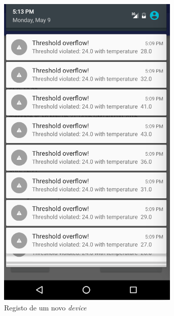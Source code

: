 \documentclass[a4paper]{article}
\begin{document}
\begin{figure}[H]
  \includegraphics[width=\linewidth]{alarmss.png}
  \caption{Registo de um novo \textit{device}}\label{fig:a}
\endminipage\hfill
{}

\end{figure}
\end{document}
